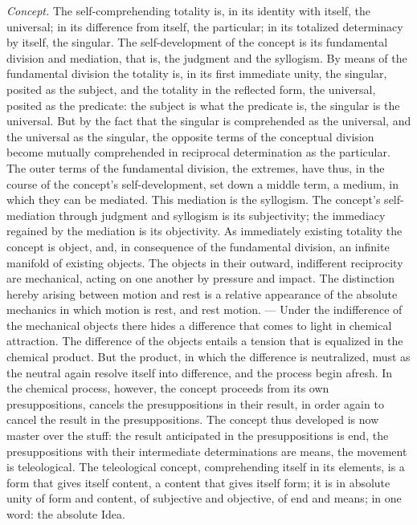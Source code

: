 \documentclass[12pt]{book}
\begin{document}
\emph{Concept.} The self-comprehending totality is, in its identity with itself,
the universal; in its difference from itself, the particular; in its totalized
determinacy by itself, the singular. The self-development of the concept is its
fundamental division and mediation, that is, the judgment and the syllogism. By
means of the fundamental division the totality is, in its first immediate unity,
the singular, posited as the subject, and the totality in the reflected form, the
universal, posited as the predicate: the subject is what the predicate is, the
singular is the universal. But by the fact that the singular is comprehended as
the universal, and the universal as the singular, the opposite terms of the
conceptual division become mutually comprehended in reciprocal determination as
the particular. The outer terms of the fundamental division, the extremes, have
thus, in the course of the concept's self-development, set down a middle term, a
medium, in which they can be mediated. This mediation is the syllogism. The
concept's self-mediation through judgment and syllogism is its subjectivity; the
immediacy regained by the mediation is its objectivity. As immediately existing
totality the concept is object, and, in consequence of the fundamental division,
an infinite manifold of existing objects. The objects in their outward,
indifferent reciprocity are mechanical, acting on one another by pressure and
impact. The distinction hereby arising between motion and rest is a relative
appearance of the absolute mechanics in which motion is rest, and rest motion.
--- Under the indifference of the mechanical objects there hides a difference
that comes to light in chemical attraction. The difference of the objects entails
a tension that is equalized in the chemical product. But the product, in which
the difference is neutralized, must as the neutral again resolve itself into
difference, and the process begin afresh. In the chemical process, however, the
concept proceeds from its own presuppositions, cancels the presuppositions in
their result, in order again to cancel the result in the presuppositions. The
concept thus developed is now master over the stuff: the result anticipated in
the presuppositions is end, the presuppositions with their intermediate
determinations are means, the movement is teleological. The teleological concept,
comprehending itself in its elements, is a form that gives itself content, a
content that gives itself form; it is in absolute unity of form and content, of
subjective and objective, of end and means; in one word: the absolute Idea.
\end{document}
